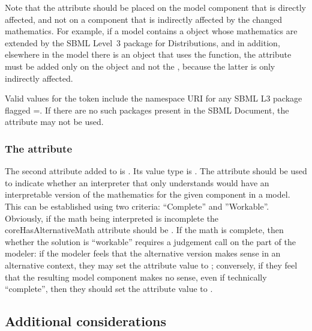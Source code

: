 Note that the  attribute should be placed on the model component that is directly affected, and not on a component that is indirectly affected by the changed mathematics.  For example, if a model contains a \FunctionDefinition object whose mathematics are extended by the SBML Level~3 package for Distributions, and in addition, elsewhere in the model there is an \InitialAssignment object that uses the function, the  attribute must be added only on the \FunctionDefinition object and not the \InitialAssignment, because the latter is only indirectly affected.

Valid values for the  token include the namespace URI for any SBML L3 package flagged  =.  If there are no such packages present in the SBML Document, the  attribute may not be used.


\subsubsection{The \fixttspace{} attribute}
\label{attribute-corehasalternativemath}

The second attribute added to \SBase is .  Its value type is .  The attribute should be used to indicate whether an interpreter that only understands \sbmlthreecore would have an interpretable version of the mathematics for the given component in a model.  This can be established using two criteria:  ``Complete'' and ''Workable''.  Obviously, if the math being interpreted is incomplete the coreHasAlternativeMath attribute should be .  If the math is complete, then whether the solution is ``workable'' requires a judgement call on the part of the modeler: if the modeler feels that the alternative version makes sense in an alternative context, they may set the attribute value to ; conversely, if they feel that the resulting model component makes no sense, even if technically ``complete'', then they should set the attribute value to .


\subsection{Additional considerations}

